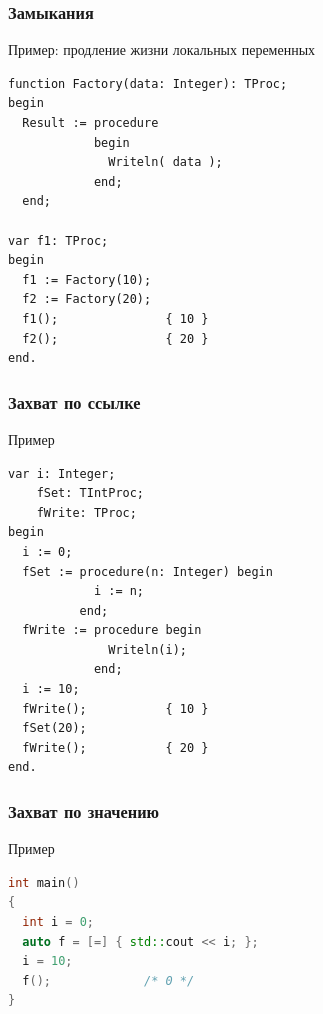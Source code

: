 \documentclass[roman,12pt]{beamer}
\begin{document}
\begin{frame}[fragile]
  \frametitle{Замыкания}
  \begin{block}{Пример: продление жизни локальных переменных}
\begin{lstlisting}
function Factory(data: Integer): TProc;
begin
  Result := procedure
            begin
              Writeln( data );
            end;
  end;
    
var f1: TProc;
begin
  f1 := Factory(10);
  f2 := Factory(20);
  f1();               { 10 }
  f2();               { 20 }
end.
\end{lstlisting}    
  \end{block} 
\end{frame}

\begin{frame}[fragile]
  \frametitle{Захват по ссылке}
  \begin{block}{Пример}
\begin{lstlisting}
var i: Integer;
    fSet: TIntProc;
    fWrite: TProc;
begin
  i := 0;
  fSet := procedure(n: Integer) begin
            i := n;
          end;
  fWrite := procedure begin
              Writeln(i);
            end;
  i := 10;
  fWrite();           { 10 }
  fSet(20);    
  fWrite();           { 20 }
end.
\end{lstlisting}
 \end{block} 
\end{frame}

\begin{frame}[fragile]
  \frametitle{Захват по значению}
 \begin{block}{Пример}
    \begin{lstlisting}[language=c++]
int main()
{
  int i = 0;
  auto f = [=] { std::cout << i; };
  i = 10;
  f();             /* 0 */
}   
    \end{lstlisting}
  \end{block} 
\end{frame}
  
\end{document}
